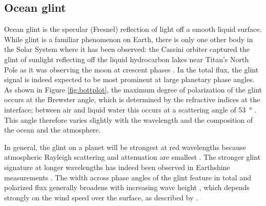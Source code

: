 \documentclass[usenatbib]{mnras}
\begin{document}

\subsection{Ocean glint}

Ocean glint is the specular (Fresnel) reflection of light off a smooth liquid surface. 
While glint is a familiar phenomenon on Earth, there is only one other body in the Solar System where it has been observed: the Cassini orbiter captured the glint of sunlight reflecting off the liquid hydrocarbon lakes near Titan's North Pole as it was observing the moon at crescent phases \citep{2010GeoRL..37.7104S}.
In the total flux, the glint signal is indeed expected to be most prominent at large planetary phase angles.
As shown in Figure \ref{fig:bottplot}, the maximum degree of polarization of the glint occurs at the Brewster angle, which is determined by the refractive indices at the interface; between air and liquid water this occurs at a scattering angle of \qty{53}{\degree} \citep[i.e., at a planetary phase angle of \qty{106}{\degree}; see, e.g.,][]{2008Icar..195..927W,Zugger_2010,treesandstam2019}.
This angle therefore varies slightly with the wavelength and the composition of the ocean and the atmosphere.

In general, the glint on a planet will be strongest at red wavelengths because atmospheric Rayleigh scattering and attenuation are smallest \citep{Zugger_2011}. The stronger glint signature at longer wavelengths has indeed been observed in Earthshine measurements \citep{Emde2017,sterzik2019, takahashi2021}. %
%
The width across phase angles of the glint feature in total and polarized flux generally broadens with increasing wave height \citep{2008Icar..195..927W, kopparla2018, treesandstam2019, trees2022}, which depends strongly on the wind speed over the surface, as described by \citet{CoxMunk1954}.
%
\end{document}
